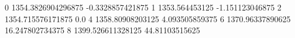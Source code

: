 0 1354.3826904296875 -0.3328857421875
1 1353.564453125 -1.151123046875
2 1354.715576171875 0.0
4 1358.80908203125 4.093505859375
6 1370.96337890625 16.247802734375
8 1399.526611328125 44.81103515625
